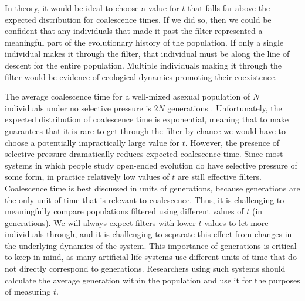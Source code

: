 \documentclass[letterpaper]{article}
\begin{document}
In theory, it would be ideal to choose a value for $t$ that falls far above the expected distribution for coalescence times. If we did so, then we could be confident that any individuals that made it past the filter represented a meaningful part of the evolutionary history of the population. If only a single individual makes it through the filter, that individual must be along the line of descent for the entire population. Multiple individuals making it through the filter would be evidence of ecological dynamics promoting their coexistence.
    
The average coalescence time for a well-mixed asexual population of $N$ individuals under no selective pressure is $2N$ generations \citep{fu_coalescing_1999}.  Unfortunately, the expected distribution of coalescence time is exponential, meaning that to make guarantees that it is rare to get through the filter by chance we would have to choose a potentially impractically large value for $t$. However, the presence of selective pressure dramatically reduces expected coalescence time. Since most systems in which people study open-ended evolution do have selective pressure of some form, in practice relatively low values of $t$ are still effective filters.
%
%
Coalescence time is best discussed in units of generations, because generations are the only unit of time that is relevant to coalescence. Thus, it is challenging to meaningfully compare populations filtered using different values of $t$ (in generations). We will always expect filters with lower $t$ values to let more individuals through, and it is challenging to separate this effect from changes in the underlying dynamics of the system. This importance of generations is critical to keep in mind, as many artificial life systems use different units of time that do not directly correspond to generations. Researchers using such systems should calculate the average generation within the population and use it for the purposes of measuring $t$.
\end{document}
